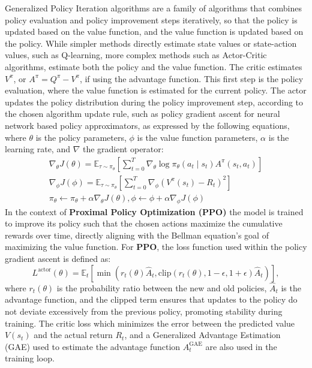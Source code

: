 Generalized Policy Iteration algorithms are a family of algorithms that combines policy evaluation and policy improvement steps iteratively,
so that the policy is updated based on the value function, and the value function is updated based on the policy.
While simpler methods directly estimate state values or state-action values, such as Q-learning, more complex methods
such as Actor-Critic algorithms, estimate both the policy and the value function.
The critic estimates $V^\pi$, or $A^{\pi} = Q^{\pi} - V^{\pi}$, if using the advantage function.
This first step is the policy evaluation, where the value function is estimated for the current policy.
The actor updates the policy distribution during the policy improvement step,
according to the chosen algorithm update rule, such as policy gradient ascent for neural network based policy approximators,
as expressed by the following equations,
where $\theta$ is the policy parameters, $\phi$ is the value function parameters,
$\alpha$ is the learning rate, and $\nabla$ the gradient operator:
\begin{gather*}
    \nabla_{\theta} J(\theta) = \mathbb{E}_{\tau \sim \pi_{\theta}} \left[ \sum_{t=0}^{T} \nabla_{\theta} \log \pi_{\theta}(a_t \mid s_t) A^{\pi}(s_t, a_t) \right]\\
    \nabla_{\phi} J(\phi) = \mathbb{E}_{\tau \sim \pi_{\theta}} \left[ \sum_{t=0}^{T} \nabla_{\phi} \left( V^{\pi}(s_t) - R_t \right)^2 \right]\\
    \pi_{\theta} \leftarrow \pi_{\theta} + \alpha \nabla_{\theta} J(\theta), \phi \leftarrow \phi + \alpha \nabla_{\phi} J(\phi)
\end{gather*}
In the context of \textbf{Proximal Policy Optimization (PPO)}
the model is trained to improve its policy such that the chosen actions maximize the cumulative rewards over time,
directly aligning with the Bellman equation's goal of maximizing the value function.
For \textbf{PPO}, the loss function used within the policy gradient ascent is defined as:
\[
    L^{\text{actor}}(\theta) = \mathbb{E}_t \left[ \min \left( r_t(\theta) \hat{A}_t, \text{clip}(r_t(\theta), 1 - \epsilon, 1 + \epsilon) \hat{A}_t \right) \right],
\]
where \( r_t(\theta) \) is the probability ratio between the new and old policies, \( \hat{A}_t \) is the advantage function,
and the clipped term ensures that updates to the policy do not deviate excessively from the previous policy, promoting stability during training.
The critic loss which minimizes the error between the predicted value \( V(s_t) \) and the actual return \( R_t \),
and a Generalized Advantage Estimation (GAE) used to estimate the advantage function \( A^{\text{GAE}}_t \) are also used in the training loop.

